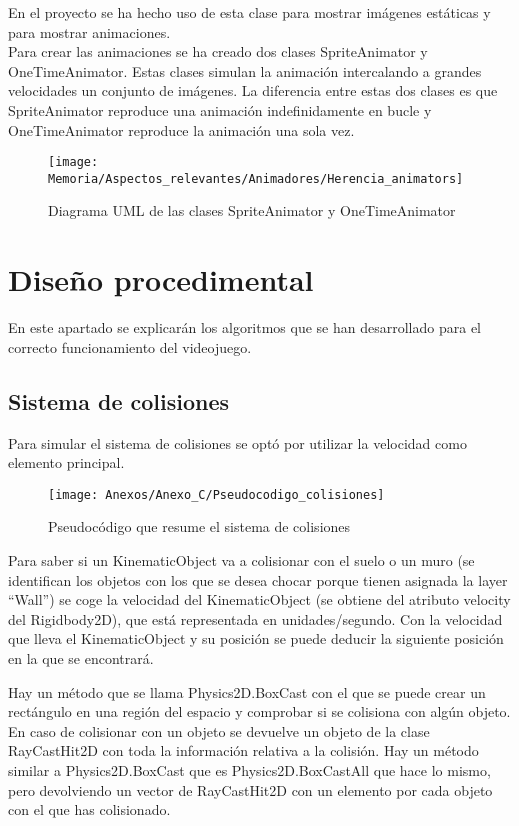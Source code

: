 En el proyecto se ha hecho uso de esta clase para mostrar imágenes estáticas y para mostrar animaciones.\\
Para crear las animaciones se ha creado dos clases SpriteAnimator y OneTimeAnimator. Estas clases simulan la animación intercalando a grandes velocidades un conjunto de imágenes. La diferencia entre estas dos clases es que SpriteAnimator reproduce una animación indefinidamente en bucle y OneTimeAnimator reproduce la animación una sola vez.

\begin{figure}[h]
\centering
\texttt{[image: Memoria/Aspectos\_relevantes/Animadores/Herencia\_animators]}
\caption{Diagrama UML de las clases SpriteAnimator y OneTimeAnimator}
\end{figure}

\section{Diseño procedimental}
En este apartado se explicarán los algoritmos que se han desarrollado para el correcto funcionamiento del videojuego.

\subsection{Sistema de colisiones}
Para simular el sistema de colisiones se optó por utilizar la velocidad como elemento principal.

\clearpage
\begin{figure}[h]
\centering
\texttt{[image: Anexos/Anexo\_C/Pseudocodigo\_colisiones]}
\caption{Pseudocódigo que resume el sistema de colisiones}
\end{figure}

Para saber si un KinematicObject va a colisionar con el suelo o un muro (se identifican los objetos con los que se desea chocar porque tienen asignada la layer “Wall”) se coge la velocidad del KinematicObject (se obtiene del atributo velocity del Rigidbody2D), que está representada en unidades/segundo. Con la velocidad que lleva el KinematicObject y su posición se puede deducir la siguiente posición en la que se encontrará.

Hay un método que se llama Physics2D.BoxCast con el que se puede crear un rectángulo en una región del espacio y comprobar si se colisiona con algún objeto. En caso de colisionar con un objeto se devuelve un objeto de la clase RayCastHit2D con toda la información relativa a la colisión. Hay un método similar a Physics2D.BoxCast que es Physics2D.BoxCastAll que hace lo mismo, pero devolviendo un vector de RayCastHit2D con un elemento por cada objeto con el que has colisionado.

